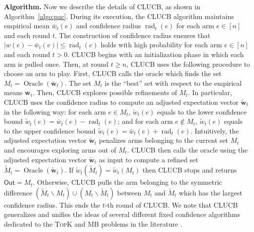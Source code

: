 \documentclass{article}
\newcommand{\wei}[1]{}
\newcommand{\wei}[1]{{\color{blue!50!black}  [\text{Wei:} #1]}}
\newcommand{\Algorithm}{{\small \textsf{CLUCB}}\xspace}
\newcommand{\del}{\backslash}
\DeclareMathOperator{\rad}{rad}
\DeclareMathOperator{\Oracle}{Oracle}
\newcommand{\out}{\mathsf{Out}}
\newcommand{\MultiIdent}{\textsc{TopK}\xspace}
\newcommand{\MultiBandit}{\textsc{MB}\xspace}
\renewcommand{\vec}[1]{\boldsymbol{#1}}
\begin{document}
\textbf{Algorithm.} 
Now we describe the details of \Algorithm, as shown in Algorithm~\ref{algo:pac}.
%
During its execution, the \Algorithm algorithm maintains empirical mean $\bar w_t(e)$ and confidence radius $\rad_t(e)$ for each arm $e\in[n]$ and each round $t$.
The construction of confidence radius ensures that $|w(e)-\bar w_t(e)| \le \rad_t(e)$ holds with high probability for each arm $e \in [n]$ and each round $t>0$.
\Algorithm begins with an initialization phase in which each arm is pulled once.
Then, at round $t \ge n$, \Algorithm uses the following procedure to choose an arm to play. 
First, \Algorithm calls the oracle which finds the set $M_t=\Oracle(\vec {\bar w}_t)$. 
The set $M_t$ is the ``best'' set with respect to the empirical means $\vec {\bar w}_t$.
Then, \Algorithm explores possible refinements of $M_t$. 
In particular, \Algorithm uses the confidence radius to compute an adjusted expectation vector $\vec {\tilde w}_t$ in the following way: for each arm $e \in M_t$, $\tilde w_t(e)$ equals to the lower confidence bound $\tilde w_t(e) = \bar w_t(e)-\rad_t(e)$; and for each arm $e\not\in M_t$, $\tilde w_t(e)$ equals to the upper confidence bound $\tilde w_t(e)=\bar w_t(e)+\rad_t(e)$.
Intuitively, the adjusted expectation vector $\vec {\tilde w}_t$ penalizes arms belonging to the current set $M_t$ and encourages exploring arms out of $M_t$.
\Algorithm then calls the oracle using the adjusted expectation vector $\vec {\tilde w}_t$ as input to compute a refined set $\tilde M_t = \Oracle(\vec {\tilde w}_t)$.
If $\tilde w_t(\tilde M_t) = \tilde w_t(M_t)$ then \Algorithm stops and returns $\out=M_t$.
Otherwise, \Algorithm pulls the arm belonging to the symmetric difference $(\tilde M_t \del M_t) \cup (M_t \del \tilde M_t)$ between $M_t$ and $\tilde M_t$ which has the largest confidence radius.
This ends the $t$-th round of \Algorithm.
We note that \Algorithm generalizes and unifies the ideas of several different fixed confidence algorithms dedicated to the \MultiIdent and \MultiBandit problems in the literature \citep{kalyanakrishnan2012pac,gabillon2012best,kaufmann2013information}.
\end{document}
